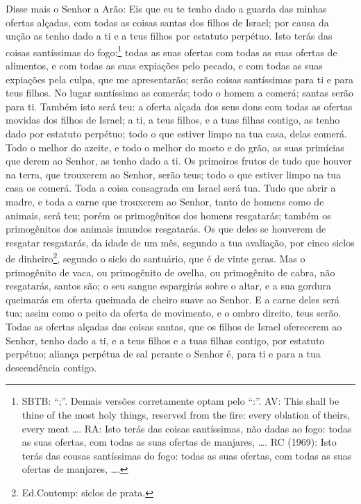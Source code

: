 Disse mais o Senhor a Arão: Eis que eu te tenho dado a guarda das
minhas ofertas alçadas, com todas as coisas santas dos filhos de
Israel; por causa da unção as tenho dado a ti e a teus filhos por
estatuto perpétuo. Isto terás das coisas santíssimas do
fogo:\footnote{SBTB: ``;''. Demais versões corretamente optam pelo
``:''. AV: This shall be thine of the most holy things, reserved
from the fire: every oblation of theirs, every meat \ldots{}. RA:
Isto terás das coisas santíssimas, não dadas ao fogo: todas as suas
ofertas, com todas as suas ofertas de manjares, \ldots{}. RC (1969):
Isto terás das cousas santíssimas do fogo: todas as suas ofertas,
com todas as suas ofertas de manjares, \ldots{}.} todas as suas
ofertas com todas as suas ofertas de alimentos, e com todas as suas
expiações pelo pecado, e com todas as suas expiações pela culpa, que
me apresentarão; serão coisas santíssimas para ti e para teus
filhos. No lugar santíssimo as comerás; todo o homem a
comerá; santas serão para ti. Também isto será teu: a oferta
alçada dos seus dons com todas as ofertas movidas dos filhos de
Israel; a ti, a teus filhos, e a tuas filhas contigo, as tenho dado
por estatuto perpétuo; todo o que estiver limpo na tua casa, delas
comerá. Todo o melhor do azeite, e todo o melhor do mosto e
do grão, as suas primícias que derem ao Senhor, as tenho dado a ti.
Os primeiros frutos de tudo que houver na terra, que
trouxerem ao Senhor, serão teus; todo o que estiver limpo na tua
casa os comerá. Toda a coisa consagrada em Israel será tua.
Tudo que abrir a madre, e toda a carne que trouxerem ao
Senhor, tanto de homens como de animais, será teu; porém os
primogênitos dos homens resgatarás; também os primogênitos dos
animais imundos resgatarás. Os que deles se houverem de
resgatar resgatarás, da idade de um mês, segundo a tua avaliação,
por cinco siclos de dinheiro\footnote{Ed.Contemp: siclos de prata.},
segundo o siclo do santuário, que é de vinte geras. Mas o
primogênito de vaca, ou primogênito de ovelha, ou primogênito de
cabra, não resgatarás, santos são; o seu sangue espargirás sobre o
altar, e a sua gordura queimarás em oferta queimada de cheiro suave
ao Senhor. E a carne deles será tua; assim como o peito da
oferta de movimento, e o ombro direito, teus serão. Todas as
ofertas alçadas das coisas santas, que os filhos de Israel
oferecerem ao Senhor, tenho dado a ti, e a teus filhos e a tuas
filhas contigo, por estatuto perpétuo; aliança perpétua de sal
perante o Senhor é, para ti e para a tua descendência contigo.

